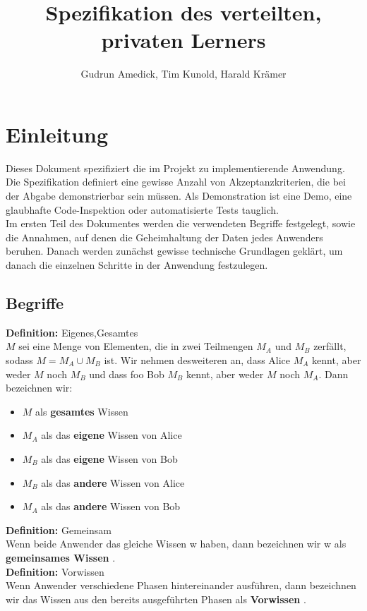\documentclass{article}
\author{Gudrun Amedick, Tim Kunold, Harald Kr\"amer}
\title{Spezifikation des verteilten, privaten Lerners}
\date{}
\newenvironment{definition}
    [1]
    {
        {\bf Definition:} #1\\
    }
    {}
\newcommand{\defined}
    [1]
    {
        {\bf #1}
    }
\begin{document}
\maketitle
\pagebreak
\tableofcontents
\pagebreak
\section{Einleitung}
Dieses Dokument spezifiziert die im Projekt zu implementierende Anwendung.
Die Spezifikation definiert eine gewisse Anzahl von Akzeptanzkriterien,
die bei der Abgabe demonstrierbar sein m\"ussen. Als Demonstration ist
eine Demo, eine glaubhafte Code-Inspektion oder automatisierte Tests tauglich.\\
Im ersten Teil des Dokumentes werden die verwendeten Begriffe festgelegt,
sowie die Annahmen, auf denen die Geheimhaltung der Daten jedes Anwenders beruhen.
Danach werden zun\"achst gewisse technische Grundlagen gekl\"art, um danach
die einzelnen Schritte in der Anwendung festzulegen.

\subsection{Begriffe}
\begin{definition}{Eigenes,Gesamtes}
\(M\) sei eine Menge von Elementen, die in zwei Teilmengen \(M_A\)
und \(M_B\) zerf\"allt, sodass \(M = M_A \cup M_B\) ist. Wir nehmen
desweiteren an, dass Alice \(M_A\) kennt, aber weder \(M\) noch \(M_B\)
und dass foo Bob \(M_B\) kennt, aber weder \(M\) noch \(M_A\). Dann bezeichnen
wir:
\begin{itemize}
\item \(M\) als \defined{gesamtes} Wissen
\item \(M_A\) als das \defined{eigene} Wissen von Alice
\item \(M_B\) als das \defined{eigene} Wissen von Bob
\item \(M_B\) als das \defined{andere} Wissen von Alice
\item \(M_A\) als das \defined{andere} Wissen von Bob
\end{itemize}
\end{definition}
\begin{definition}{Gemeinsam}
Wenn beide Anwender das gleiche Wissen w haben, dann bezeichnen wir w
als \defined{gemeinsames Wissen}. 
\end{definition}\\
\begin{definition}{Vorwissen}
Wenn Anwender verschiedene Phasen hintereinander ausf\"uhren, dann bezeichnen
wir das Wissen aus den bereits ausgef\"uhrten Phasen als \defined{Vorwissen}.
\end{definition}\\
\end{document}
